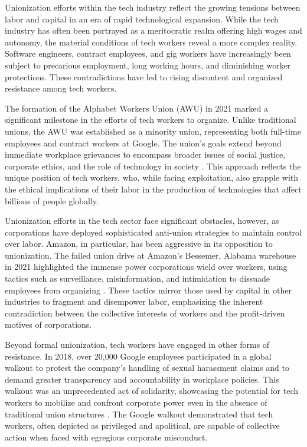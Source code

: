 \begin{refsection}
Unionization efforts within the tech industry reflect the growing tensions between labor and capital in an era of rapid technological expansion. While the tech industry has often been portrayed as a meritocratic realm offering high wages and autonomy, the material conditions of tech workers reveal a more complex reality. Software engineers, contract employees, and gig workers have increasingly been subject to precarious employment, long working hours, and diminishing worker protections. These contradictions have led to rising discontent and organized resistance among tech workers.

The formation of the Alphabet Workers Union (AWU) in 2021 marked a significant milestone in the efforts of tech workers to organize. Unlike traditional unions, the AWU was established as a minority union, representing both full-time employees and contract workers at Google. The union’s goals extend beyond immediate workplace grievances to encompass broader issues of social justice, corporate ethics, and the role of technology in society \cite[pp.~92-94]{turner2021}. This approach reflects the unique position of tech workers, who, while facing exploitation, also grapple with the ethical implications of their labor in the production of technologies that affect billions of people globally.

Unionization efforts in the tech sector face significant obstacles, however, as corporations have deployed sophisticated anti-union strategies to maintain control over labor. Amazon, in particular, has been aggressive in its opposition to unionization. The failed union drive at Amazon’s Bessemer, Alabama warehouse in 2021 highlighted the immense power corporations wield over workers, using tactics such as surveillance, misinformation, and intimidation to dissuade employees from organizing \cite[pp.~14-16]{sainato2021}. These tactics mirror those used by capital in other industries to fragment and disempower labor, emphasizing the inherent contradiction between the collective interests of workers and the profit-driven motives of corporations.

Beyond formal unionization, tech workers have engaged in other forms of resistance. In 2018, over 20,000 Google employees participated in a global walkout to protest the company’s handling of sexual harassment claims and to demand greater transparency and accountability in workplace policies. This walkout was an unprecedented act of solidarity, showcasing the potential for tech workers to mobilize and confront corporate power even in the absence of traditional union structures \cite[pp.~32-34]{tarnoff2019}. The Google walkout demonstrated that tech workers, often depicted as privileged and apolitical, are capable of collective action when faced with egregious corporate misconduct.


\end{refsection}
